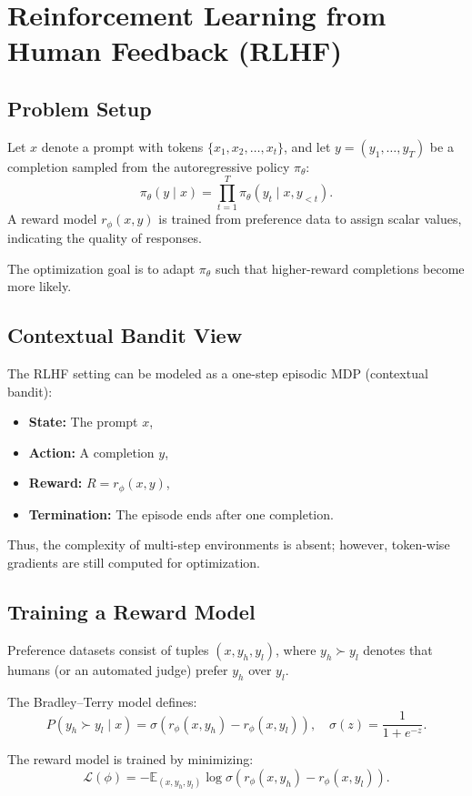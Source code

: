 \section{Reinforcement Learning from Human Feedback (RLHF)}

\subsection{Problem Setup}
Let $x$ denote a prompt with tokens $\{x_1, x_2, \ldots, x_t\}$, and let $y = (y_1, \ldots, y_T)$ be a completion sampled from the autoregressive policy $\pi_\theta$:
\[
\pi_\theta(y \mid x) = \prod_{t=1}^T \pi_\theta(y_t \mid x, y_{<t}).
\]
A reward model $r_\phi(x,y)$ is trained from preference data to assign scalar values, indicating the quality of responses.

The optimization goal is to adapt $\pi_\theta$ such that higher-reward completions become more likely.

\subsection{Contextual Bandit View}
The RLHF setting can be modeled as a one-step episodic MDP (contextual bandit):
\begin{itemize}
    \item \textbf{State:} The prompt $x$,
    \item \textbf{Action:} A completion $y$,
    \item \textbf{Reward:} $R = r_\phi(x,y)$,
    \item \textbf{Termination:} The episode ends after one completion.
\end{itemize}
Thus, the complexity of multi-step environments is absent; however, token-wise gradients are still computed for optimization.

\subsection{Training a Reward Model}
Preference datasets consist of tuples $(x,y_h,y_l)$, where $y_h \succ y_l$ denotes that humans (or an automated judge) prefer $y_h$ over $y_l$.  

The Bradley–Terry model defines:
\[
P(y_h \succ y_l \mid x) = \sigma\!\left( r_\phi(x,y_h) - r_\phi(x,y_l) \right), 
\quad \sigma(z) = \frac{1}{1+e^{-z}}.
\]

The reward model is trained by minimizing:
\[
\mathcal{L}(\phi) = - \mathbb{E}_{(x,y_h,y_l)} \log \sigma\!\left( r_\phi(x,y_h) - r_\phi(x,y_l) \right).
\]

